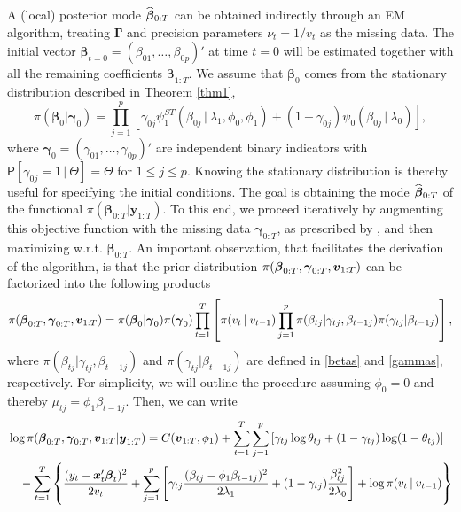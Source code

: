 \documentclass[ba]{imsart}
\numberwithin{equation}{section}
\theoremstyle{plain}
\def\bG{\bm{\Gamma}}
\def\x{\mbox{\boldmath$x$}}
\def\y{\mbox{\boldmath$y$}}
\def\b{\mbox{\boldmath$b$}}
\def\v{\mbox{\boldmath$v$}}
\newcommand{\bm}[1]{\boldsymbol{#1}}
\renewcommand{\P}{\mathsf{P}}
\newcommand{\wh}[1]{\smash{\widehat{#1}}}
\def\C {\,|\:}
\def\C {\,|\:}
\def\y{\bm{y}}
\def\bg{\bm{\gamma}}
\def\b{\bm{\beta}}
\begin{document}
{{{A (local) posterior mode $\wh{\b}_{0:T}$ can be obtained  indirectly through an EM algorithm, treating  $\bG$ and precision parameters $\nu_t=1/v_t$  as the missing data. 
The initial vector $\b_{t=0}=(\beta_{01},\dots,\beta_{0p})'$ at time $t=0$  will be estimated together with all the remaining coefficients $\b_{1:T}$. We assume that $\b_0$ comes from the  stationary distribution  
described in Theorem \ref{thm1},
\begin{equation}\label{initial}
\pi(\b_0|\bg_0)=\prod_{j=1}^p\left[\gamma_{0j}\psi_1^{ST}(\beta_{0j}\C\lambda_1,\phi_0,\phi_1)+(1-\gamma_{0j})\psi_0(\beta_{0j}\C\lambda_0)\right],
\end{equation}
where $\bg_0=(\gamma_{01},\dots,\gamma_{0p})'$  are independent binary indicators with $\P[\gamma_{0j}=1\C\Theta]=\Theta$ for $1\leq j\leq p$. 
Knowing the stationary distribution is thereby useful   for specifying the initial conditions. The goal is obtaining the   mode $\wh{\b}_{0:T} $ of the functional 
$\pi(\b_{0:T}|\y_{1:T})$. To this end, we proceed iteratively by augmenting this objective function with the missing data $\bg_{0:T}$, as prescribed by \cite{RG14},  and then maximizing w.r.t. $\b_{0:T}$. 
An important  observation, that facilitates the derivation of the algorithm, is that the prior distribution $\pi(\b_{0:T},\bg_{0:T}, \v_{1:T})$ can be factorized into the following products
$$
\pi(\b_{0:T},\bg_{0:T}, \v_{1:T})=\pi(\b_0|\bg_0)\pi(\bg_0)\prod_{t=1}^T\left[\pi(v_t\C v_{t-1})\prod_{j=1}^p\pi(\beta_{tj}|\gamma_{tj},\beta_{t-1j})\pi(\gamma_{tj}|\beta_{t-1j})\right],
$$
where $\pi(\beta_{tj}|\gamma_{tj},\beta_{t-1j})$ and $\pi(\gamma_{tj}|\beta_{t-1j})$ are defined in \eqref{betas} and \eqref{gammas}, respectively.
For simplicity, we will outline the procedure assuming $\phi_0=0$ and thereby $\mu_{tj}=\phi_1\beta_{t-1j}$. Then, we can write
\begin{align}\label{Q1}
&\log\pi(\b_{0:T},\bg_{0:T}, \v_{1:T}|\bm y_{1:T})=C(\bm v_{1:T},\phi_1) + \sum_{t=1}^T\sum_{j=1}^p\left[\gamma_{tj}\log\theta_{tj}+(1-\gamma_{tj})\log(1-\theta_{tj})\right]\\
&\quad-\sum_{t=1}^T\left\{\frac{(y_t-\x_t'\b_t)^2}{2v_t}+\sum_{j=1}^p\left[ \gamma_{tj}\frac{(\beta_{tj}-\phi_1\beta_{t-1j})^2}{2\lambda_1} +  (1-\gamma_{tj})\frac{\beta_{tj}^2}{2\lambda_0}\right]+\log\pi(v_t\C v_{t-1})\right\}\notag\\

\end{align}}}}
\end{document}
